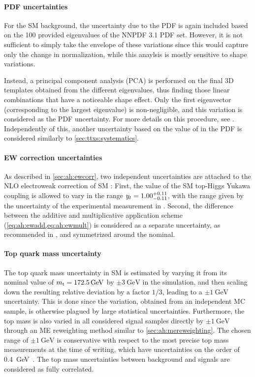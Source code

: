 \paragraph{PDF uncertainties}
For the SM \ttbar background, the uncertainty due to the PDF is again included based on the 100 provided eigenvalues of the NNPDF 3.1 PDF set. However, it is not sufficient to simply take the envelope of these variations since this would capture only the change in \ttbar normalization, while this anaylsis is mostly sensitive to shape variations.

Instead, a principal component analysis (PCA) is performed on the final 3D \mttchelchan templates obtained from the different eigenvalues, thus finding those linear combinations that have a noticeable shape effect. Only the first eigenvector (corresponding to the largest eigenvalue) is non-negligible, and this variation is considered as the PDF uncertainty. For more details on this procedure, see . Independently of this, another uncertainty based on the value of \alphas in the PDF is considered similarly to \cref{sec:ttxs:systematics}.

\paragraph{EW correction uncertainties}
As described in \cref{sec:ah:ewcorr}, two independent uncertainties are attached to the NLO electroweak correction of SM {\ttbar}: First, the value of the SM top-Higgs Yukawa coupling is allowed to vary in the range $y_t = {1.00}^{+0.11}_{-0.11}$, with the range given by the uncertainty of the experimental measurement in . Second, the difference between the additive and multiplicative application scheme (\cref{eq:ah:ewadd,eq:ah:ewmult}) is considered as a separate uncertainty, as recommended in , and symmetrized around the nominal.

\paragraph{Top quark mass uncertainty}
The top quark mass uncertainty in SM \ttbar is estimated by varying it from its nominal value of $\mt = \SI{172.5}{\GeV}$ by $\pm \SI{3}{\GeV}$ in the \powheg simulation, and then scaling down the resulting relative deviation by a factor $1/3$, leading to a $\pm \SI{1}{\GeV}$ uncertainty. This is done since the variation, obtained from an independent MC sample, is otherwise plagued by large statistical uncertainties. Furthermore, the top mass is also varied in all considered signal samples directly by $\pm \SI{1}{\GeV}$ through an ME reweighting method similar to \cref{sec:ah:mereweighting}. The chosen range of $\pm \SI{1}{\GeV}$ is conservative with respect to the most precise top mass measurements at the time of writing, which have uncertainties on the order of \SI{0.4}{\GeV}~\cite{CMS:TOP-20-008,ATLASCMS:2024dxp}. The top mass uncertainties between background and signals are considered as fully correlated.

